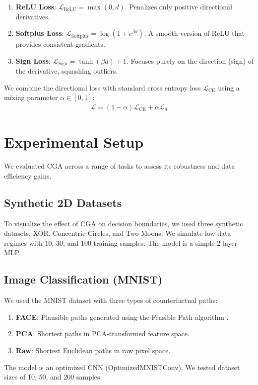 \documentclass[sigconf,anonymous]{aamas}
\begin{document}
\begin{enumerate}
    \item \textbf{ReLU Loss}: $\mathcal{L}_{\text{ReLU}} = \max(0, d)$. Penalizes only positive directional derivatives.
    \item \textbf{Softplus Loss}: $\mathcal{L}_{\text{Softplus}} = \log(1 + e^{\beta d})$. A smooth version of ReLU that provides consistent gradients.
    \item \textbf{Sign Loss}: $\mathcal{L}_{\text{Sign}} = \tanh(\beta d) + 1$. Focuses purely on the direction (sign) of the derivative, squashing outliers.
\end{enumerate}

We combine the directional loss with standard cross entropy loss $\mathcal{L}_{\textrm{CE}}$ using a mixing parameter $\alpha \in [0,1]$:
\begin{align}\label{eq:lambda}
    \mathcal{L} = (1-\alpha)\mathcal{L}_{\textrm{CE}} + \alpha \mathcal{L}_{d}
\end{align}

\section{Experimental Setup}
We evaluated CGA across a range of tasks to assess its robustness and data efficiency gains.

\subsection{Synthetic 2D Datasets}
To visualize the effect of CGA on decision boundaries, we used three synthetic datasets: XOR, Concentric Circles, and Two Moons. We simulate low-data regimes with 10, 30, and 100 training samples. The model is a simple 2-layer MLP.

\subsection{Image Classification (MNIST)}
We used the MNIST dataset with three types of counterfactual paths:
\begin{enumerate}
    \item \textbf{FACE}: Plausible paths generated using the Feasible Path algorithm \cite{poyiadzi2020face}.
    \item \textbf{PCA}: Shortest paths in PCA-transformed feature space.
    \item \textbf{Raw}: Shortest Euclidean paths in raw pixel space.
\end{enumerate}
The model is an optimized CNN (OptimizedMNISTConv). We tested dataset sizes of 10, 50, and 200 samples.
\end{document}
